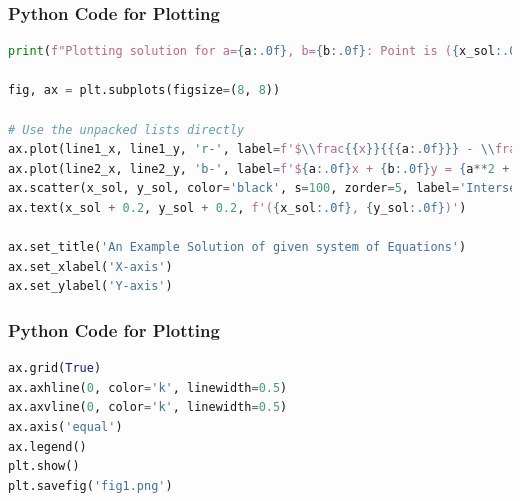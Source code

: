 \documentclass{beamer}
\theoremstyle{remark}
\numberwithin{equation}{section}
\begin{document}
\begin{frame}[fragile]
\frametitle{Python Code for Plotting}
\begin{lstlisting}[language=Python]
print(f"Plotting solution for a={a:.0f}, b={b:.0f}: Point is ({x_sol:.0f}, {y_sol:.0f})")

fig, ax = plt.subplots(figsize=(8, 8))

# Use the unpacked lists directly
ax.plot(line1_x, line1_y, 'r-', label=f'$\\frac{{x}}{{{a:.0f}}} - \\frac{{y}}{{{b:.0f}}} = 0$')
ax.plot(line2_x, line2_y, 'b-', label=f'${a:.0f}x + {b:.0f}y = {a**2 + b**2:.0f}$')
ax.scatter(x_sol, y_sol, color='black', s=100, zorder=5, label='Intersection Point')
ax.text(x_sol + 0.2, y_sol + 0.2, f'({x_sol:.0f}, {y_sol:.0f})')

ax.set_title('An Example Solution of given system of Equations')
ax.set_xlabel('X-axis')
ax.set_ylabel('Y-axis')
\end{lstlisting}
\end{frame}

\begin{frame}[fragile]
\frametitle{Python Code for Plotting}
\begin{lstlisting}[language=Python] 
ax.grid(True)
ax.axhline(0, color='k', linewidth=0.5)
ax.axvline(0, color='k', linewidth=0.5)
ax.axis('equal')
ax.legend()
plt.show()
plt.savefig('fig1.png')
\end{lstlisting}
\end{frame}
\end{document}
